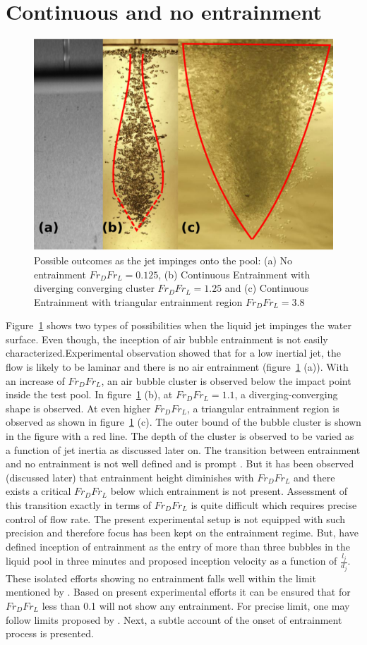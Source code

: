 \section{Continuous and no entrainment}
\begin{figure}
	\centering
	\includegraphics[width=0.75\linewidth]{chapters/jetPool/Figure8}
	\caption{Possible outcomes as the jet impinges onto the pool: (a) No entrainment $Fr_DFr_L = 0.125$, (b) Continuous Entrainment with diverging converging cluster $Fr_DFr_L = 1.25$ and (c) Continuous Entrainment with triangular entrainment region  $Fr_DFr_L = 3.8$}
	\label{Figure::transition}
\end{figure}
Figure~\ref{Figure::transition} shows two types of possibilities when the liquid jet impinges the water surface. Even though, the inception of air bubble entrainment is not easily characterized.Experimental observation showed that for a low inertial jet, the flow is likely to be laminar and there is no air entrainment (figure~\ref{Figure::transition} (a)). With an increase of $Fr_DFr_L$, an air bubble cluster is observed below the impact point inside the test pool. In figure~\ref{Figure::transition} (b), at $Fr_DFr_L = 1.1$, a diverging-converging shape is observed. At even higher $Fr_DFr_L$, a triangular entrainment region is observed as shown in figure~\ref{Figure::transition} (c). The outer bound of the bubble cluster is shown in the figure with a red line. The depth of the cluster is observed to be varied as a function of jet inertia as discussed later on. The transition between entrainment and no entrainment is not well defined and is prompt \citep{Harby2014,ervine1980effect}. But it has been observed (discussed later) that entrainment height diminishes with $Fr_DFr_L$ and there exists a critical $Fr_DFr_L$ below which entrainment is not present. Assessment of this transition exactly in terms of $Fr_DFr_L$ is quite difficult which requires precise control of flow rate. The present experimental setup is not equipped with such precision and therefore focus has been kept on the entrainment regime. But, \citet{Harby2014} have defined inception of entrainment as the entry of more than three bubbles in the liquid pool in three minutes and proposed inception velocity as a function of $\frac{l_j}{d_j}$. These isolated efforts showing no entrainment falls well within the limit mentioned by \citet{Harby2014}. Based on present experimental efforts it can be ensured that for $Fr_DFr_L$ less than 0.1 will not show any entrainment. For precise limit, one may follow limits proposed by \citet{Harby2014}. Next, a subtle account of the onset of entrainment process is presented.
